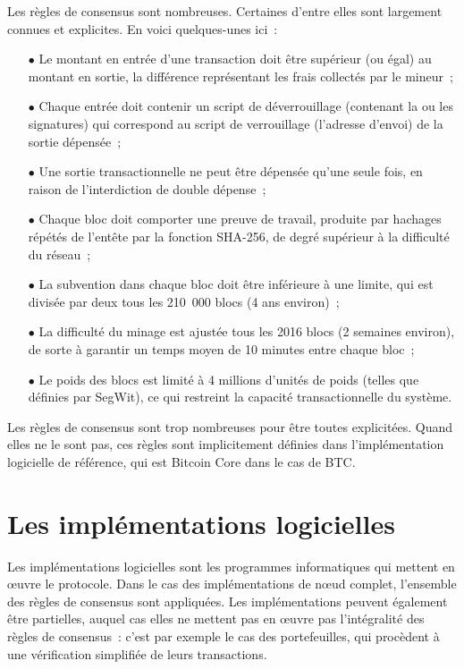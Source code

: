 Les règles de consensus sont nombreuses. Certaines d'entre elles sont largement connues et explicites. En voici quelques-unes ici~:

\begin{itemize}
\item[$\bullet$] Le montant en entrée d'une transaction doit être supérieur (ou égal) au montant en sortie, la différence représentant les frais collectés par le mineur~;
\item[$\bullet$] Chaque entrée doit contenir un script de déverrouillage (contenant la ou les signatures) qui correspond au script de verrouillage (l'adresse d'envoi) de la sortie dépensée~;
\item[$\bullet$] Une sortie transactionnelle ne peut être dépensée qu'une seule fois, en raison de l'interdiction de double dépense~;
\item[$\bullet$] Chaque bloc doit comporter une preuve de travail, produite par hachages répétés de l'entête par la fonction SHA-256, de degré supérieur à la difficulté du réseau~;
\item[$\bullet$] La subvention dans chaque bloc doit être inférieure à une limite, qui est divisée par deux tous les 210~000 blocs (4 ans environ)~;
\item[$\bullet$] La difficulté du minage est ajustée tous les 2016 blocs (2 semaines environ), de sorte à garantir un temps moyen de 10 minutes entre chaque bloc~;
\item[$\bullet$] Le poids des blocs est limité à 4 millions d'unités de poids (telles que définies par SegWit), ce qui restreint la capacité transactionnelle du système.
\end{itemize}

Les règles de consensus sont trop nombreuses pour être toutes explicitées. Quand elles ne le sont pas, ces règles sont implicitement définies dans l'implémentation logicielle de référence, qui est Bitcoin Core dans le cas de BTC.

\section*{Les implémentations logicielles}


Les implémentations logicielles sont les programmes informatiques qui mettent en œuvre le protocole. Dans le cas des implémentations de nœud complet, l'ensemble des règles de consensus sont appliquées. Les implémentations peuvent également être partielles, auquel cas elles ne mettent pas en œuvre pas l'intégralité des règles de consensus~: c'est par exemple le cas des portefeuilles, qui procèdent à une vérification simplifiée de leurs transactions.

